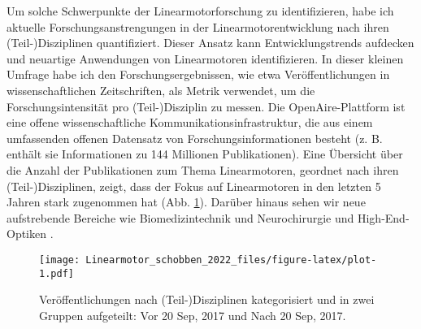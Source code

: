 \documentclass[
  oneside]{book}
\begin{document}
Um solche Schwerpunkte der Linearmotorforschung zu identifizieren, habe ich aktuelle Forschungsanstrengungen in der Linearmotorentwicklung nach ihren (Teil-)Disziplinen quantifiziert. Dieser Ansatz kann Entwicklungstrends aufdecken und neuartige Anwendungen von Linearmotoren identifizieren. In dieser kleinen Umfrage habe ich den Forschungsergebnissen, wie etwa Veröffentlichungen in wissenschaftlichen Zeitschriften, als Metrik verwendet, um die Forschungsintensität pro (Teil-)Disziplin zu messen. Die OpenAire-Plattform \citep{openaire2022} ist eine offene wissenschaftliche Kommunikationsinfrastruktur, die aus einem umfassenden offenen Datensatz von Forschungsinformationen besteht (z. B. enthält sie Informationen zu 144 Millionen Publikationen). Eine Übersicht über die Anzahl der Publikationen zum Thema Linearmotoren, geordnet nach ihren (Teil-)Disziplinen, zeigt, dass der Fokus auf Linearmotoren in den letzten 5 Jahren stark zugenommen hat (Abb. \ref{fig:plot}). Darüber hinaus sehen wir neue aufstrebende Bereiche wie Biomedizintechnik und Neurochirurgie \citep{alberto2018, zamanian2019, fromme2019, do2019} und High-End-Optiken \citep[Rasterelektronenmikroskope][]{mo2017}.

\begin{figure}
\centering
\texttt{[image: Linearmotor\_schobben\_2022\_files/figure-latex/plot-1.pdf]}
\caption{\label{fig:plot}Veröffentlichungen nach (Teil-)Disziplinen kategorisiert und in zwei Gruppen aufgeteilt: Vor 20 Sep, 2017 und Nach 20 Sep, 2017.}
\end{figure}
\end{document}
